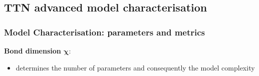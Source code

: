 \documentclass[xcolor=table,8pt]{beamer}
\begin{document}



    \subsection{TTN advanced model characterisation}
    \begin{frame}[t]
        \frametitle{Model Characterisation: parameters and metrics}

        \textbf{Bond dimension \( \boldsymbol{\chi} \)}:
        \begin{itemize}
            \item determines the \alert{number of parameters} and consequently the \alert{model complexity}
        \end{itemize}


\end{frame}
\end{document}

